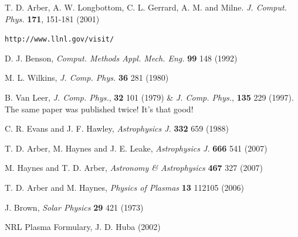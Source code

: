 \documentclass[11pt]{article}
\begin{document}
\newpage
\begin{thebibliography}{}

 T. D. Arber, A. W. Longbottom, C. L. Gerrard, A. M. and Milne. \textit{J. Comput. Phys.} \textbf{171}, 151-181 (2001)

 {\tt http://www.llnl.gov/visit/}

 D. J. Benson, \textit{Comput. Methods Appl. Mech. Eng.} \textbf{99} 148 (1992) 

 M. L. Wilkins, \textit{J. Comp. Phys.} \textbf{36} 281 (1980)

 B. Van Leer, \textit{J. Comp. Phys.}, \textbf{32} 101 (1979)  \& \textit{J. Comp. Phys.}, \textbf{135} 229 (1997). The same paper was published twice! It's that good!

 C. R. Evans and J. F. Hawley, \textit{Astrophysics J.} \textbf{332} 659 (1988) 

 T. D. Arber, M. Haynes and J. E. Leake, {\it Astrophysics J.} \textbf{666} 541 (2007)

 M. Haynes and T. D. Arber, \textit{Astronomy \& Astrophysics } \textbf{467} 327 (2007)

 T. D. Arber and M. Haynes, \textit{Physics of Plasmas} \textbf{13} 112105 (2006)

 J. Brown, \textit{Solar Physics} \textbf{29} 421 (1973)

 NRL Plasma Formulary, J. D. Huba (2002)

\end{thebibliography}
\end{document}

